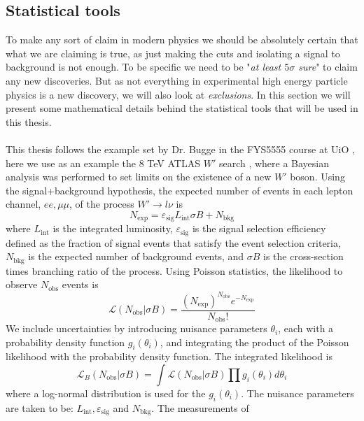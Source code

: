 \documentclass[12pt, a4paper]{book}
\begin{document}
\subsection{Statistical tools}\label{sec:stat_anal}
To make any sort of claim in modern physics we should be absolutely certain that what we are claiming is true, as just making the cuts and isolating a signal to background is not enough. To be specific we need to be "\textit{at least $5\sigma$ sure}" to claim any new discoveries. 
But as not everything in experimental high energy particle physics is a new discovery, we will also look at \textit{exclusions}. In this section we will present some mathematical details behind the statistical tools that will be used in this thesis.\\ 
\\This thesis follows the example set by Dr. Bugge in the FYS5555 course at UiO \cite{magnar_pensum}, here we use as an example the 8 TeV ATLAS $W'$ search \cite{Stat},
where a Bayesian analysis was performed to set limits on the existence of a new $W'$ boson. Using the signal+background hypothesis, the expected number of events in each lepton channel, $ee, \mu\mu$, of the process $W'\rightarrow l\nu$ is 
$$
    N_{\text{exp}} = \varepsilon_{\text{sig}}L_{\text{int}}\sigma B + N_{\text{bkg}}
$$
where $L_{\text{int}}$ is the integrated luminosity, $\varepsilon_{\text{sig}}$ is the signal selection efficiency defined as the fraction of signal events that satisfy the event selection criteria, $N_{\text{bkg}}$ is the expected number of background events, and $\sigma B$ is the 
cross-section times branching ratio of the process. Using Poisson statistics, the likelihood to observe $N_{\text{obs}}$ events is
\begin{equation}\label{eq:observed_events_prob}
    \mathcal{L}(N_{\text{obs}}\vert \sigma B) = \frac{(N_{\text{exp}})^{N_{\text{obs}}}e^{-N_{\text{exp}}}}{N_{\text{obs}}!}
\end{equation}
We include uncertainties by introducing nuisance parameters $\theta_i$, each with a probability density function $g_i(\theta_i)$, and integrating the product of the Poisson likelihood with the probability density function. The integrated likelihood is
\begin{equation}\label{eq:observed_events_nuisance}
    \mathcal{L}_B(N_{\text{obs}}\vert \sigma B)=\int\mathcal{L}(N_{\text{obs}}\vert \sigma B)\prod g_i(\theta_i)d\theta_i
\end{equation}
where a log-normal distribution is used for the $g_i(\theta_i)$. The nuisance parameters are taken to be: $L_{\text{int}}, \varepsilon_{\text{sig}}$ and $N_{\text{bkg}}$. The measurements of 
\end{document}
